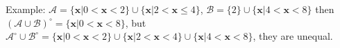\documentclass[
	12pt, %
]{fphw}
\begin{document}
\begin{enumerate}[a. ]
	Example: $\mathcal{A}=\{\mathbf{x}|0< \mathbf{x} <2\}\cup \{\mathbf{x}|2< \mathbf{x}\leq 4\}$, $\mathcal{B}=\{2\}\cup \{\mathbf{x}|4< \mathbf{x}< 8\}$
	then $(\mathcal{A}\cup \mathcal{B})^{\circ}=\{\mathbf{x}|0< \mathbf{x}< 8\}$, but ${\mathcal{A}}^{\circ}\cup {\mathcal{B}}^{\circ}=\{\mathbf{x}|0< \mathbf{x} <2\}\cup \{\mathbf{x}|2< \mathbf{x} <4\}\cup \{\mathbf{x}|4< \mathbf{x} <8\}$, they are unequal.
	
	
	
\end{enumerate}

\end{document}

